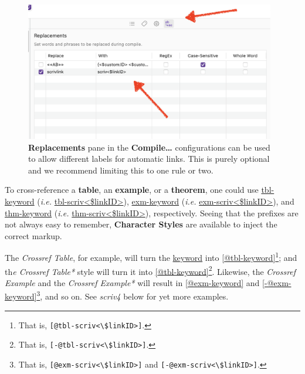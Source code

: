 \documentclass[
  12pt,
  a4paper,
  oneside,
  numbers=noenddot,
  titlepage,
  toclink=all,
  toc=bibliography]{scrbook}
\theoremstyle{definition}
\theoremstyle{definition}
\theoremstyle{definition}
\theoremstyle{plain}
\theoremstyle{plain}
\theoremstyle{plain}
\theoremstyle{plain}
\theoremstyle{plain}
\theoremstyle{remark}
\begin{document}
\begin{figure}

{\centering \includegraphics[width=4.30208in,height=2.38542in]{Replacements.png}

}

\caption{\label{fig-scriv3}\textbf{Replacements} pane in the
\textbf{Compile\ldots{}} configurations can be used to allow different
labels for automatic links. This is purely optional and we recommend
limiting this to one rule or two.}

\end{figure}

{}To cross-reference a \textbf{table}, an
\textbf{example}, or a \textbf{theorem}, one could use \ul{tbl-keyword}
(\emph{i.e.} \ul{tbl-scriv\textless\$linkID\textgreater{}}),
\ul{exm-keyword} (\emph{i.e.}
\ul{exm-scriv\textless\$linkID\textgreater{}}), and \ul{thm-keyword}
(\emph{i.e.} \ul{thm-scriv\textless\$linkID\textgreater{}}),
respectively. Seeing that the prefixes are not always easy to remember,
\textbf{Character Styles} are available to inject the correct markup.

The \emph{Crossref Table}, for example, will turn the \ul{keyword} into
\ul{{[}@tbl-keyword{]}}\footnote{That is,
  \texttt{{[}@tbl-scriv\textless{}\textbackslash{}\$linkID\textgreater{}{]}}.}\ul{;}
and th\emph{e Crossref Table*} style will turn it into
\ul{{[}@tbl-keyword{]}}\footnote{That is,
  \texttt{{[}-@tbl-scriv\textless{}\textbackslash{}\$linkID\textgreater{}{]}}.}.
{} Likewise, the \emph{Crossref
Example} and the \emph{Crossref Example*} will result in
\ul{{[}@exm-keyword{]}} and \ul{{[}-@exm-keyword{]}}\footnote{That is,
  \texttt{{[}@exm-scriv\textless{}\textbackslash{}\$linkID\textgreater{}{]}}
  and
  \texttt{{[}-@exm-scriv\textless{}\textbackslash{}\$linkID\textgreater{}{]}}.},
and so on. See \emph{scriv4} below for yet more examples.
\end{document}
